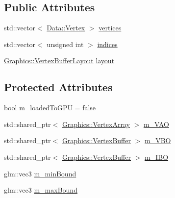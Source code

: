 \subsection*{Public Attributes}
\begin{DoxyCompactItemize}
\item 
std\+::vector$<$ \hyperlink{struct_cookie_eng_1_1_data_1_1_vertex}{Data\+::\+Vertex} $>$ \hyperlink{struct_cookie_eng_1_1_resources_1_1_mesh_aa2d9365b3bb9855de51053a1bbde84a1}{vertices}
\item 
std\+::vector$<$ unsigned int $>$ \hyperlink{struct_cookie_eng_1_1_resources_1_1_mesh_a78ad4658bc848293472999b4708b85ab}{indices}
\item 
\hyperlink{class_cookie_eng_1_1_graphics_1_1_vertex_buffer_layout}{Graphics\+::\+Vertex\+Buffer\+Layout} \hyperlink{struct_cookie_eng_1_1_resources_1_1_mesh_a7d60f959cc5a9cadbc59299e207032f2}{layout}
\end{DoxyCompactItemize}
\subsection*{Protected Attributes}
\begin{DoxyCompactItemize}
\item 
bool \hyperlink{struct_cookie_eng_1_1_resources_1_1_mesh_aa244e9f1890ccfa204a3d7df97a3b056}{m\+\_\+loaded\+To\+G\+PU} = false
\item 
std\+::shared\+\_\+ptr$<$ \hyperlink{class_cookie_eng_1_1_graphics_1_1_vertex_array}{Graphics\+::\+Vertex\+Array} $>$ \hyperlink{struct_cookie_eng_1_1_resources_1_1_mesh_a2d54038e4b55e1733fcc7e8c64969767}{m\+\_\+\+V\+AO}
\item 
std\+::shared\+\_\+ptr$<$ \hyperlink{class_cookie_eng_1_1_graphics_1_1_vertex_buffer}{Graphics\+::\+Vertex\+Buffer} $>$ \hyperlink{struct_cookie_eng_1_1_resources_1_1_mesh_a3420e235a3449e5d8f15378b410d89bd}{m\+\_\+\+V\+BO}
\item 
std\+::shared\+\_\+ptr$<$ \hyperlink{class_cookie_eng_1_1_graphics_1_1_vertex_buffer}{Graphics\+::\+Vertex\+Buffer} $>$ \hyperlink{struct_cookie_eng_1_1_resources_1_1_mesh_aff20a2371d9413acc57ab5ff9086fa15}{m\+\_\+\+I\+BO}
\item 
glm\+::vec3 \hyperlink{struct_cookie_eng_1_1_resources_1_1_mesh_a15be180ae31ec95a947b3f716a082a99}{m\+\_\+min\+Bound}
\item 
glm\+::vec3 \hyperlink{struct_cookie_eng_1_1_resources_1_1_mesh_a7a4f588b705bf49e406ad66d1165534c}{m\+\_\+max\+Bound}
\end{DoxyCompactItemize}


